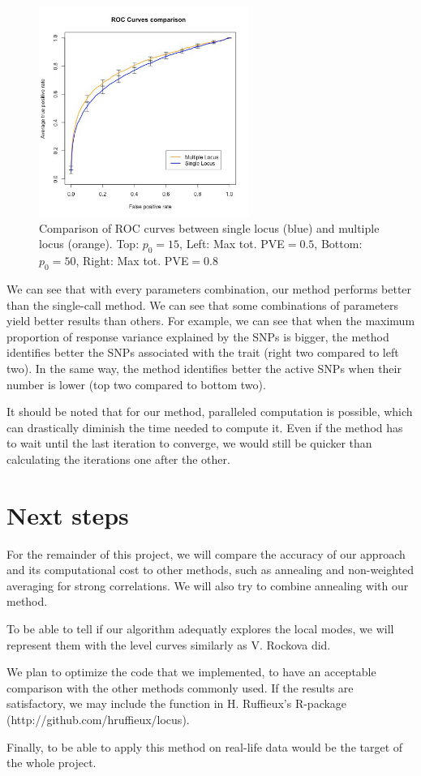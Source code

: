 \documentclass{article}
\numberwithin{equation}{section}
\begin{document}
\begin{figure}[h!]
\includegraphics[width=2.7in, bb= 0 0 1.7in 1.7in]{images/ROC_Comp_p0_50_var_0_8.jpeg}
\caption{\label{fig:ROCComp}Comparison of ROC curves between single locus (blue) and multiple locus (orange). Top: $p_0 = 15$, Left: Max tot. PVE$ = 0.5$,
Bottom: $p_0 = 50$, Right: Max tot. PVE$ = 0.8$}
\end{figure}

We can see that with every parameters combination, our method performs better than the single-call method. We can see that some combinations of parameters yield better results than others. For example, we can see that when the maximum proportion of response variance explained by the SNPs is bigger, the method identifies better the SNPs associated with the trait (right two compared to left two). In the same way, the method identifies better the active SNPs when their number is lower (top two compared to bottom two).


It should be noted that for our method, paralleled computation is possible, which can drastically diminish the time needed to compute it. Even if the method has to wait until the last iteration to converge, we would still be quicker than calculating the iterations one after the other.
\newpage
\section{Next steps}
For the remainder of this project, we will compare the accuracy of our approach and its computational cost to other methods, such as annealing and non-weighted averaging for strong correlations. We will also try to combine annealing with our method.\cite{glob}

To be able to tell if our algorithm adequatly explores the local modes, we will represent them with the level curves similarly as V. Rockova \cite{rockova} did.

We plan to optimize the code that we implemented, to have an acceptable comparison with the other methods commonly used. If the results are satisfactory, we may include the function in H. Ruffieux's R-package (http://github.com/hruffieux/locus).

Finally, to be able to apply this method on real-life data would be the target of the whole project.
\newpage


\end{document}
